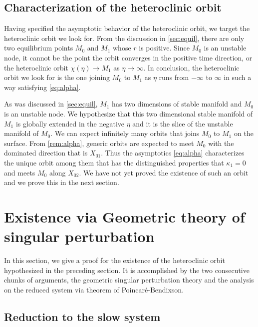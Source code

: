 \documentclass[a4paper,11pt]{article}
\begin{document}
\subsection{Characterization of the heteroclinic orbit}
Having specified the asymptotic behavior of the heteroclinic orbit, we target the heteroclinic orbit we look for. From the discussion in \ref{sec:equil}, there are only two equilibrium points $M_0$ and $M_1$ whose $r$ is positive. Since $M_0$ is an unstable node, it cannot be the point the orbit converges in the positive time direction, or the heteroclinic orbit $\chi(\eta) \rightarrow M_1$ as $\eta \rightarrow \infty$. In conclusion, the heteroclinic orbit we look for is the one joining $M_0$ to $M_1$ as $\eta$ runs from $-\infty$ to $\infty$ in such a way satisfying \eqref{eq:alpha}.

As was discussed in \ref{sec:equil}, $M_1$ has two dimensions of stable manifold and $M_0$ is an unstable node. We hypothesize that this two dimensional stable manifold of $M_1$ is globally extended in the negative $\eta$ and it is the slice of the unstable manifold of $M_0$. We can expect infinitely many orbits that joins $M_0$ to $M_1$ on the surface. From \ref{rem:alpha}, generic orbits are expected to meet $M_0$ with the dominated direction that is $X_{01}$. Thus the asymptotics \eqref{eq:alpha} characterizes the unique orbit among them that has the distinguished properties that $\kappa_1=0$ and meets $M_0$ along $X_{02}$. We have not yet proved the existence of such an orbit and we prove this in the next section.

\section{Existence via Geometric theory of singular perturbation}
In this section, we give a proof for the existence of the heteroclinic orbit hypothesized in the preceding section. It is accomplished by the two consecutive chunks of arguments, the geometric singular perturbation theory and the analysis on the reduced system via theorem of Poincar\'e-Bendixson.



\subsection{Reduction to the slow system}

\hrulefill
\end{document}
